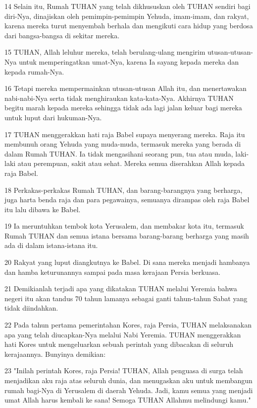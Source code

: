 \par 14 Selain itu, Rumah TUHAN yang telah dikhususkan oleh TUHAN sendiri bagi diri-Nya, dinajiskan oleh pemimpin-pemimpin Yehuda, imam-imam, dan rakyat, karena mereka turut menyembah berhala dan mengikuti cara hidup yang berdosa dari bangsa-bangsa di sekitar mereka.
\par 15 TUHAN, Allah leluhur mereka, telah berulang-ulang mengirim utusan-utusan-Nya untuk memperingatkan umat-Nya, karena Ia sayang kepada mereka dan kepada rumah-Nya.
\par 16 Tetapi mereka mempermainkan utusan-utusan Allah itu, dan menertawakan nabi-nabi-Nya serta tidak menghiraukan kata-kata-Nya. Akhirnya TUHAN begitu marah kepada mereka sehingga tidak ada lagi jalan keluar bagi mereka untuk luput dari hukuman-Nya.
\par 17 TUHAN menggerakkan hati raja Babel supaya menyerang mereka. Raja itu membunuh orang Yehuda yang muda-muda, termasuk mereka yang berada di dalam Rumah TUHAN. Ia tidak mengasihani seorang pun, tua atau muda, laki-laki atau perempuan, sakit atau sehat. Mereka semua diserahkan Allah kepada raja Babel.
\par 18 Perkakas-perkakas Rumah TUHAN, dan barang-barangnya yang berharga, juga harta benda raja dan para pegawainya, semuanya dirampas oleh raja Babel itu lalu dibawa ke Babel.
\par 19 Ia meruntuhkan tembok kota Yerusalem, dan membakar kota itu, termasuk Rumah TUHAN dan semua istana bersama barang-barang berharga yang masih ada di dalam istana-istana itu.
\par 20 Rakyat yang luput diangkutnya ke Babel. Di sana mereka menjadi hambanya dan hamba keturunannya sampai pada masa kerajaan Persia berkuasa.
\par 21 Demikianlah terjadi apa yang dikatakan TUHAN melalui Yeremia bahwa negeri itu akan tandus 70 tahun lamanya sebagai ganti tahun-tahun Sabat yang tidak diindahkan.
\par 22 Pada tahun pertama pemerintahan Kores, raja Persia, TUHAN melaksanakan apa yang telah diucapkan-Nya melalui Nabi Yeremia. TUHAN menggerakkan hati Kores untuk mengeluarkan sebuah perintah yang dibacakan di seluruh kerajaannya. Bunyinya demikian:
\par 23 "Inilah perintah Kores, raja Persia! TUHAN, Allah penguasa di surga telah menjadikan aku raja atas seluruh dunia, dan menugaskan aku untuk membangun rumah bagi-Nya di Yerusalem di daerah Yehuda. Jadi, kamu semua yang menjadi umat Allah harus kembali ke sana! Semoga TUHAN Allahmu melindungi kamu."



